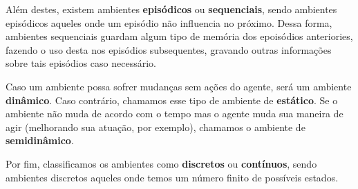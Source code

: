 Além destes, existem ambientes \textbf{episódicos} ou \textbf{sequenciais},
sendo ambientes episódicos aqueles onde um episódio não influencia no próximo.
Dessa forma, ambientes sequenciais guardam algum tipo de memória dos epoisódios
anteriories, fazendo o uso desta nos episódios subsequentes, gravando outras
informações sobre tais episódios caso necessário.

Caso um ambiente possa sofrer mudanças sem ações do agente, será um ambiente
\textbf{dinâmico}. Caso contrário, chamamos esse tipo de ambiente de
\textbf{estático}. Se o ambiente não muda de acordo com o tempo mas o agente
muda sua maneira de agir (melhorando sua atuação, por exemplo), chamamos o
ambiente de \textbf{semidinâmico}.

Por fim, classificamos os ambientes como \textbf{discretos} ou
\textbf{contínuos}, sendo ambientes discretos aqueles onde temos um número
finito de possíveis estados.






